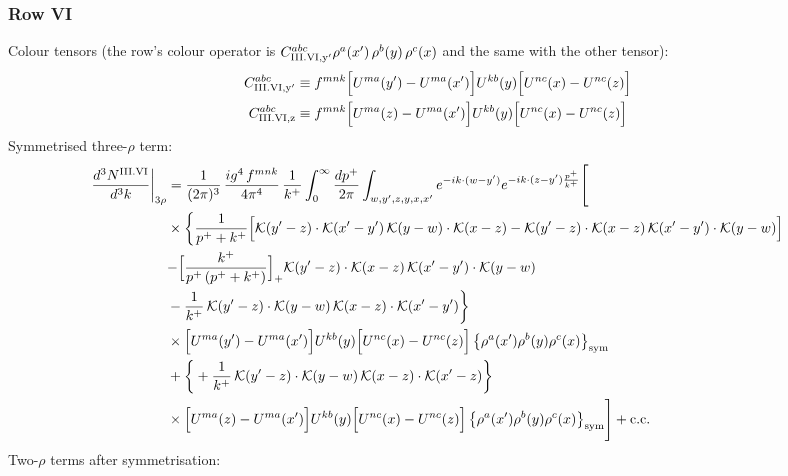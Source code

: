 \documentclass[9pt]{article}
\numberwithin{equation}{section}
\begin{document}
\subsubsection*{Row VI}
Colour tensors (the row's colour operator is $C^{abc}_{{\rm III.VI,y'}}\rho^{a}(x')\,\rho^{b}(y)\,\rho^{c}(x)$ and the same with the other tensor):
\begin{align}
C^{abc}_{{\rm III.VI,y'}}&\equiv f^{mnk}\Big[U^{ma}(y')-U^{ma}(x')\Big]U^{kb}(y)\Big[U^{nc}(x)-U^{nc}(z)\Big]\notag\\
C^{abc}_{{\rm III.VI,z}}&\equiv f^{mnk}\Big[U^{ma}(z)-U^{ma}(x')\Big]U^{kb}(y)\Big[U^{nc}(x)-U^{nc}(z)\Big]\notag
\end{align}
Symmetrised three-$\rho$ term:
\begin{align}
\frac{d^{3}N^{\rm III.VI}}{d^{3}k}\bigg|_{3\rho}&=\frac{1}{(2\pi)^{3}}\,\frac{ig^{4}\,f^{mnk}}{4\pi^{4}}\,\frac{1}{k^{+}}\int_{0}^{\infty}\frac{dp^{+}}{2\pi}\int_{w,y',z,y,x,x'}e^{-ik\cdot{(w-y')}}e^{-ik\cdot{(z-y')}\frac{p^{+}}{k^{+}}}\Bigg[\notag\\
&\times\bigg\{\frac{1}{p^{+}+k^{+}}\Big[\mathcal{K}(y'-z)\cdot\mathcal{K}(x'-y')\,\mathcal{K}(y-w)\cdot\mathcal{K}(x-z)-\mathcal{K}(y'-z)\cdot\mathcal{K}(x-z)\,\mathcal{K}(x'-y')\cdot\mathcal{K}(y-w)\Big]\notag\\
&{-\Big[\frac{k^{+}}{p^{+}\,(p^{+}+k^{+})}\Big]_{+}\mathcal{K}(y'-z)\cdot\mathcal{K}(x-z)\,\mathcal{K}(x'-y')\cdot\mathcal{K}(y-w)}\notag\\
&-\frac{1}{k^{+}}\,\mathcal{K}(y'-z)\cdot\mathcal{K}(y-w)\,\mathcal{K}(x-z)\cdot\mathcal{K}(x'-y')\bigg\}\notag\\
&\times \Big[U^{ma}(y')-U^{ma}(x')\Big]U^{kb}(y)\Big[U^{nc}(x)-U^{nc}(z)\Big]\,\big\{\rho^{a}(x')\rho^{b}(y)\rho^{c}(x)\big\}_{\rm sym}\notag\\
&+\bigg\{+\frac{1}{k^{+}}\,\mathcal{K}(y'-z)\cdot\mathcal{K}(y-w)\,\mathcal{K}(x-z)\cdot\mathcal{K}(x'-z)\bigg\}\notag\\
&\times \Big[U^{ma}(z)-U^{ma}(x')\Big]U^{kb}(y)\Big[U^{nc}(x)-U^{nc}(z)\Big]\,\big\{\rho^{a}(x')\rho^{b}(y)\rho^{c}(x)\big\}_{\rm sym}\Bigg]+{\rm c.c.}\label{eq:D-III.VI-3}
\end{align}
Two-$\rho$ terms after symmetrisation:
\end{document}
